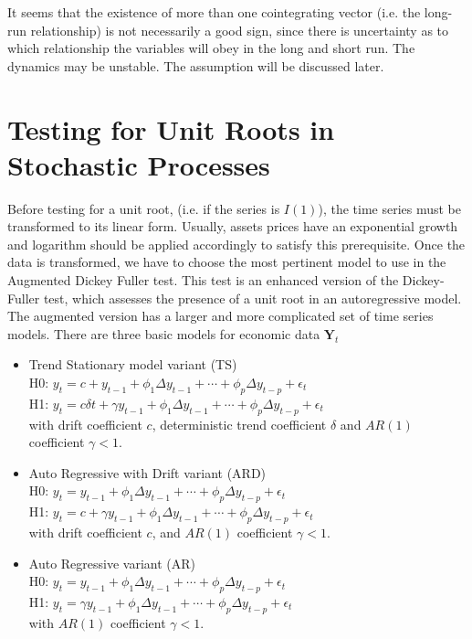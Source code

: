 \documentclass[11pt,a4,twosided,singlespacing,titlepagenumber=on]{scrreprt}
\numberwithin{equation}{chapter} %
\theoremstyle{remark}
\newcommand{\matr}[1]{\mathbf{#1}}
\begin{document}
It seems that the existence of more than one cointegrating vector (i.e. the long-run relationship) is not necessarily a good sign, since there is uncertainty as to which relationship the variables will obey in the long and short run. The dynamics may be unstable. The assumption will be discussed later.

\section{Testing for Unit Roots in Stochastic Processes}
\label{sec:unit_root_testing}
Before testing for a unit root, (i.e. if the series is $I(1)$), the time series must be transformed to its linear form. Usually, assets prices have an exponential growth and logarithm should be applied accordingly to satisfy this prerequisite. Once the data is transformed, we have to choose the most pertinent model to use in the Augmented Dickey Fuller test. This test is an enhanced version of the Dickey-Fuller test, which assesses the presence of a unit root in an autoregressive model. The augmented version has a larger and more complicated set of time series models. There are three basic models for economic data $\matr{Y}_t$
\begin{itemize}
\item Trend Stationary model variant (TS) \\
H0: $y_t = c + y_{t-1} + \phi_1 \Delta y_{t-1} + \cdots + \phi_p \Delta y_{t-p} + \epsilon_t $ \\
H1: $y_t = c \delta t + \gamma y_{t-1} + \phi_1 \Delta y_{t-1} + \cdots + \phi_p \Delta y_{t-p} + \epsilon_t $ \\
with drift coefficient $c$, deterministic trend coefficient $\delta$ and $AR(1)$ coefficient $\gamma <1$.
\item Auto Regressive with Drift variant (ARD) \\
H0: $y_t = y_{t-1} + \phi_1 \Delta y_{t-1} + \cdots + \phi_p \Delta y_{t-p} + \epsilon_t $ \\
H1: $y_t = c + \gamma y_{t-1} + \phi_1 \Delta y_{t-1} + \cdots + \phi_p \Delta y_{t-p} + \epsilon_t $ \\
with drift coefficient $c$, and $AR(1)$ coefficient $\gamma <1$.
\item Auto Regressive variant (AR) \\
H0: $y_t = y_{t-1} + \phi_1 \Delta y_{t-1} + \cdots + \phi_p \Delta y_{t-p} + \epsilon_t $ \\
H1: $y_t = \gamma y_{t-1} + \phi_1 \Delta y_{t-1} + \cdots + \phi_p \Delta y_{t-p} + \epsilon_t $ \\
with $AR(1)$ coefficient $\gamma <1$.
\end{itemize}
\end{document}
